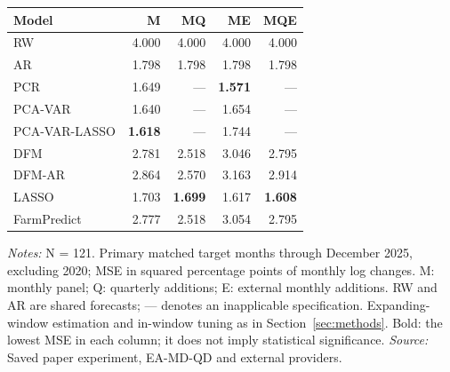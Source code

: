\begin{threeparttable}
\begin{tabular}{lrrrr}
\toprule
Model & M & MQ & ME & MQE \\
\midrule
RW & 4.000 & 4.000 & 4.000 & 4.000 \\
AR & 1.798 & 1.798 & 1.798 & 1.798 \\
PCR & 1.649 & --- & \textbf{1.571} & --- \\
PCA-VAR & 1.640 & --- & 1.654 & --- \\
PCA-VAR-LASSO & \textbf{1.618} & --- & 1.744 & --- \\
DFM & 2.781 & 2.518 & 3.046 & 2.795 \\
DFM-AR & 2.864 & 2.570 & 3.163 & 2.914 \\
LASSO & 1.703 & \textbf{1.699} & 1.617 & \textbf{1.608} \\
FarmPredict & 2.777 & 2.518 & 3.054 & 2.795 \\
\bottomrule
\end{tabular}
\begin{tablenotes}[flushleft]\footnotesize
\item \textit{Notes:} N = 121. Primary matched target months through December 2025, excluding 2020; MSE in squared percentage points of monthly log changes. M: monthly panel; Q: quarterly additions; E: external monthly additions. RW and AR are shared forecasts; --- denotes an inapplicable specification. Expanding-window estimation and in-window tuning as in Section~\ref{sec:methods}. Bold: the lowest MSE in each column; it does not imply statistical significance. \textit{Source:} Saved paper experiment, EA-MD-QD and external providers.
\end{tablenotes}
\end{threeparttable}
